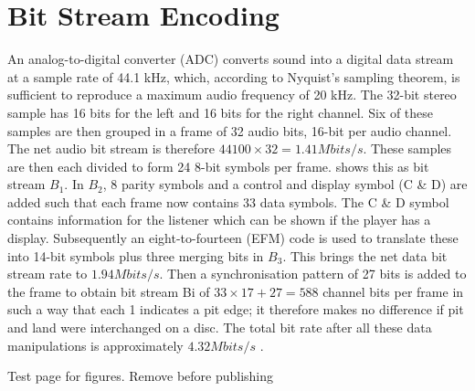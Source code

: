 \documentclass[../main.tex]{subfiles}
\begin{document}
    \section{Bit Stream Encoding}
    An analog-to-digital converter (ADC) converts sound into a digital data stream at a sample rate of 44.1 kHz, which, according to Nyquist's sampling theorem, is sufficient to reproduce a maximum audio frequency of 20 kHz. The 32-bit stereo sample has 16 bits for the left and 16 bits for the right channel. Six of these samples are then grouped in a frame of 32 audio bits, 16-bit per audio channel. The net audio bit stream is therefore $44100 \times 32=1.41 Mbits/s$. These samples are then each divided to form 24 8-bit symbols per frame.  shows this as bit stream $B_1$. In $B_2$, 8 parity symbols and a control and display symbol (C \& D) are added such that each frame now contains 33 data symbols. The C \& D symbol contains information for the listener which can be shown if the player has a display. Subsequently an eight-to-fourteen (EFM) code is used to translate these into 14-bit symbols plus three merging bits in $B_3$. This brings the net data bit stream rate to $1.94 Mbits/s$. Then a synchronisation pattern of 27 bits is added to the frame to obtain bit stream Bi of $33 \times 17+27=588$ channel bits per frame in such a way that each 1 indicates a pit edge; it therefore makes no difference if pit and land were interchanged on a disc. The total bit rate after all these data manipulations is approximately $4.32 Mbits/s$ \autocite{wicker1999reed}.

\iffalse
    \newpage

    Test page for figures. Remove before publishing
\end{document}

